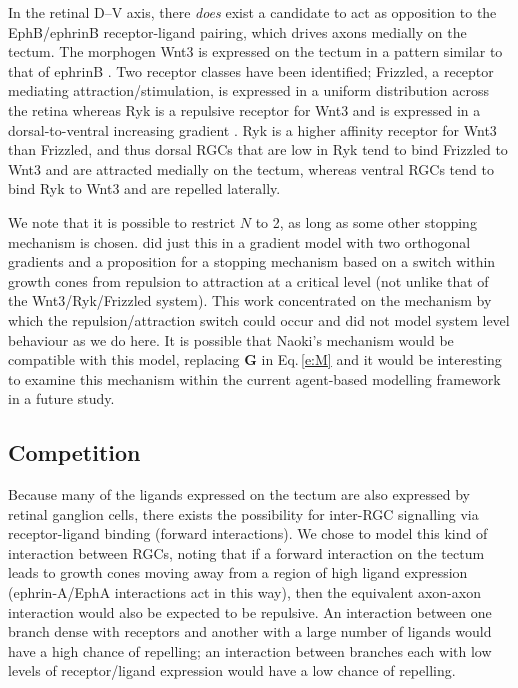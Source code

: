 \documentclass[11pt, a4paper]{article}
\begin{document}
In the retinal D--V axis, there \emph{does} exist a candidate to act as opposition to the EphB/ephrinB receptor-ligand pairing, which drives axons medially on the tectum. 
The morphogen Wnt3 is expressed on the tectum in a pattern similar to that of ephrinB \citep{schmitt_wntryk_2006}. 
Two receptor classes have been identified; Frizzled, a receptor mediating attraction/stimulation, is expressed in a uniform distribution across the retina whereas Ryk is a repulsive receptor for Wnt3 and is expressed in a dorsal-to-ventral increasing gradient \citep{schmitt_wntryk_2006}. Ryk is a higher affinity receptor for Wnt3 than Frizzled, and thus dorsal RGCs that are low in Ryk tend to bind Frizzled to Wnt3 and are attracted medially on the tectum, whereas ventral RGCs tend to bind Ryk to Wnt3 and are repelled laterally.

We note that it is possible to restrict $N$ to 2, as long as some other stopping mechanism is chosen. 
\citet{naoki_revisiting_2017} did just this in a gradient model with two orthogonal gradients and a proposition for a stopping mechanism based on a switch within growth cones from repulsion to attraction at a critical level (not unlike that of the Wnt3/Ryk/Frizzled system). 
This work concentrated on the mechanism by which the repulsion/attraction switch could occur and did not model system level behaviour as we do here. 
It is possible that Naoki's mechanism would be compatible with this model, replacing $\mathbf{G}$ in Eq.\,\ref{e:M} and it would be interesting to examine this mechanism within the current agent-based modelling framework in a future study.

\subsection*{Competition}

Because many of the ligands expressed on the tectum are also expressed by retinal ganglion cells, there exists the possibility for inter-RGC signalling via receptor-ligand binding (forward interactions). 
We chose to model this kind of interaction between RGCs, noting that if a forward interaction on the tectum leads to growth cones moving away from a region of high ligand expression (ephrin-A/EphA interactions act in this way), then the equivalent axon-axon interaction would also be expected to be repulsive. An interaction between one branch dense with receptors and another with a large number of ligands would have a high chance of repelling; an interaction between branches each with low levels of receptor/ligand expression would have a low chance of repelling.
\end{document}

